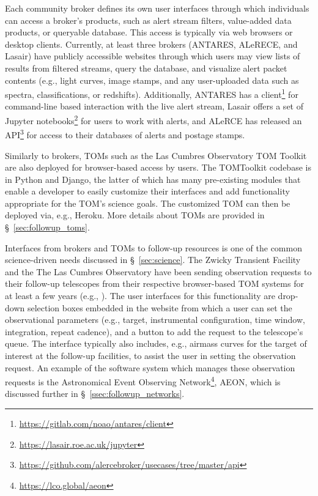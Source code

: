 Each community broker defines its own user interfaces through which individuals can access a broker's products, such as alert stream filters, value-added data products, or queryable database.
This access is typically via web browsers or desktop clients.
Currently, at least three brokers (\gls{ANTARES}, ALeRECE, and Lasair) have publicly accessible websites through which users may view lists of results from filtered streams, query the database, and visualize alert packet contents (e.g., light curves, image stamps, and any user-uploaded data such as spectra, classifications, or redshifts).
Additionally, \gls{ANTARES} has a client\footnote{\url{https://gitlab.com/noao/antares/client}} for command-line based interaction with the live alert stream, Lasair offers a set of {\sc Jupyter} notebooks\footnote{\url{https://lasair.roe.ac.uk/jupyter}} for users to work with alerts, and ALeRCE has released an \gls{API}\footnote{\url{https://github.com/alercebroker/usecases/tree/master/api}} for access to their databases of alerts and postage stamps.

Similarly to brokers, TOMs such as the Las Cumbres Observatory \gls{TOM} Toolkit \citep{2018SPIE10707E..11S} are also deployed for browser-based access by users.
The TOMToolkit codebase is in {\sc Python} and {\sc Django}, the latter of which has many pre-existing modules that enable a developer to easily customize their interfaces and add functionality appropriate for the \gls{TOM}'s science goals.
The customized \gls{TOM} can then be deployed via, e.g., {\sc Heroku}. More details about TOMs are provided in \S~\ref{sec:followup_toms}.

Interfaces from brokers and TOMs to follow-up resources is one of the common science-driven needs discussed in \S~\ref{sec:science}.
The Zwicky Transient Facility and the The Las Cumbres Observatory have been sending observation requests to their follow-up telescopes from their respective browser-based \gls{TOM} systems for at least a few years (e.g., \citealt{2018SPIE10707E..11S}).
The user interfaces for this functionality are drop-down selection boxes embedded in the website from which a user can set the observational parameters (e.g., target, instrumental \gls{configuration}, time window, integration, repeat cadence), and a button to add the request to the telescope's queue.
The interface typically also includes, e.g., \gls{airmass} curves for the target of interest at the follow-up facilities, to assist the user in setting the observation request.
An example of the software system which manages these observation requests is the Astronomical Event Observing Network\footnote{\url{https://lco.global/aeon}}, \gls{AEON}, which is discussed further in \S~\ref{ssec:followup_networks}.


